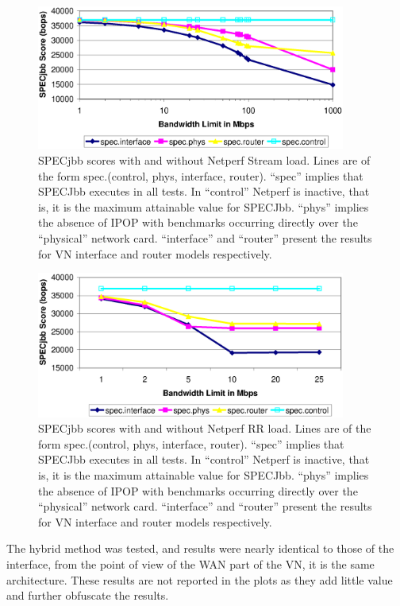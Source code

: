 \begin{figure}
\centering
\includegraphics[width=4in]{figs/stream.spec.jpg.eps}
\caption[Grid SPECjbb evaluation, Stream load]{SPECjbb scores with and without
Netperf Stream load.  Lines are of the form spec.(control, phys, interface,
router).  ``spec'' implies that SPECJbb executes in all tests.  In ``control''
Netperf is inactive, that is, it is the maximum attainable value for SPECJbb.
``phys'' implies the absence of IPOP with benchmarks occurring directly over
the ``physical'' network card.  ``interface'' and ``router'' present the
results for VN interface and router models respectively.}
\label{fig:stream.spec}
\end{figure}


\begin{figure}
\centering
\includegraphics[width=4in]{figs/rr.spec.jpg.eps}
\caption[Grid SPECjbb evaluation, RR load]{SPECjbb scores with and without
Netperf RR load.  Lines are of the form spec.(control, phys, interface,
router).  ``spec'' implies that SPECJbb executes in all tests.  In ``control''
Netperf is inactive, that is, it is the maximum attainable value for SPECJbb.
``phys'' implies the absence of IPOP with benchmarks occurring directly over
the ``physical'' network card.  ``interface'' and ``router'' present the
results for VN interface and router models respectively.}
\label{fig:rr.spec}
\end{figure}

The hybrid method was tested, and results were nearly identical to those of the
interface, from the point of view of the WAN part of the VN, it is the same
architecture.  These results are not reported in the plots as they add little
value and further obfuscate the results.

